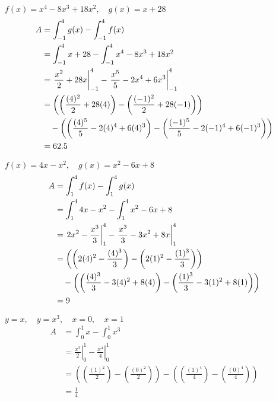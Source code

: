 \documentclass[12pt]{article}
\newenvironment{problem}[2][]{
    \begin{trivlist}
        \item[
            {\bfseries #1}
            {\bfseries #2.}
        ]
}{\end{trivlist}}
\newcommand{\plugin}[2]{\left(\left({#1}\right) - \left({#2}\right)\right)}
\newcommand{\defint}[3]{\int_{#1}^{#2} #3}
\newcommand{\inteval}[3]{\left.#3\right|_{#1}^{#2}}
\begin{document}
\begin{problem}{15}
$f(x) = x^4 - 8x^3 + 18x^2, \quad g(x) = x + 28$
\begin{align}
A &= \defint{-1}{4}{g(x)} - \defint{-1}{4}{f(x)} \\
&= \defint{-1}{4}{x + 28} - \defint{-1}{4}{x^4 - 8x^3 + 18x^2} \\
&= \inteval{-1}{4}{\frac{x^2}{2} + 28x} - \inteval{-1}{4}{\frac{x^5}{5} - 2x^4 + 6x^3} \\
&= \plugin{\frac{(4)^2}{2} + 28(4)}{\frac{(-1)^2}{2} + 28(-1)} \notag \\
&\quad - \plugin{\frac{(4)^5}{5} - 2(4)^4 + 6(4)^3}{\frac{(-1)^5}{5} - 2(-1)^4 + 6(-1)^3} \\
&= 62.5
\end{align}
\end{problem}

\begin{problem}{16}
$f(x) = 4x - x^2, \quad g(x) = x^2 - 6x + 8$
\begin{align}
A &= \defint{1}{4}{f(x)} - \defint{1}{4}{g(x)} \\
&= \defint{1}{4}{4x - x^2} - \defint{1}{4}{x^2 - 6x + 8} \\
&= \inteval{1}{4}{2x^2 - \frac{x^3}{3}} - \inteval{1}{4}{\frac{x^3}{3} - 3x^2 + 8x} \\
&= \plugin{2(4)^2 - \frac{(4)^3}{3}}{2(1)^2 - \frac{(1)^3}{3}} \notag \\
&\quad - \plugin{\frac{(4)^3}{3} - 3(4)^2 + 8(4)}{\frac{(1)^3}{3} - 3(1)^2 + 8(1)} \\
&= 9
\end{align}
\end{problem}

\begin{problem}{17}
$y = x, \quad y = x^3, \quad x = 0, \quad x = 1$
\begin{align}
A &= \defint{0}{1}{x} - \defint{0}{1}{x^3} \\
&= \inteval{0}{1}{\frac{x^2}{2}} - \inteval{0}{1}{\frac{x^4}{4}} \\
&= \plugin{\frac{(1)^2}{2}}{\frac{(0)^2}{2}} - \plugin{\frac{(1)^4}{4}}{\frac{(0)^4}{4}} \\
&= \frac{1}{4}
\end{align}
\end{problem}

\clearpage
\end{document}

